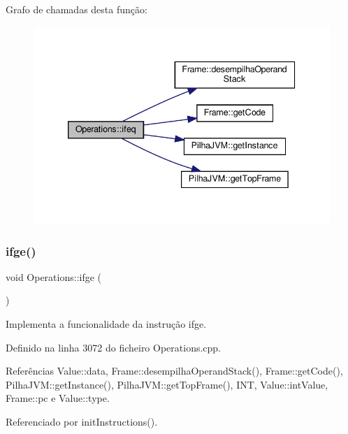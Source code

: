 Grafo de chamadas desta função\+:\nopagebreak
\begin{figure}[H]
\begin{center}
\leavevmode
\includegraphics[width=339pt]{classOperations_ad33c8bdb5f67bdbf0885bb51990f99ee_cgraph}
\end{center}
\end{figure}
\mbox{\label{classOperations_a0e7cf2111ad25ee52aa329cc6ec4d38a}} 
\subsubsection{\texorpdfstring{ifge()}{ifge()}}
{\footnotesize\ttfamily void Operations\+::ifge (\begin{DoxyParamCaption}{ }\end{DoxyParamCaption})\hspace{0.3cm}{\ttfamily [private]}}



Implementa a funcionalidade da instrução ifge. 



Definido na linha 3072 do ficheiro Operations.\+cpp.



Referências Value\+::data, Frame\+::desempilha\+Operand\+Stack(), Frame\+::get\+Code(), Pilha\+J\+V\+M\+::get\+Instance(), Pilha\+J\+V\+M\+::get\+Top\+Frame(), I\+NT, Value\+::int\+Value, Frame\+::pc e Value\+::type.



Referenciado por init\+Instructions().

